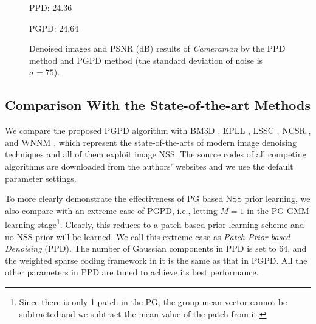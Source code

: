 \begin{figure}[ht!]
{\begin{minipage}[t]{0.24\textwidth}
{\footnotesize PPD: 24.36}
\end{minipage}
\begin{minipage}[t]{0.24\textwidth}
\centering
{}
{\footnotesize PGPD: 24.64}
\end{minipage}
}\vspace{-3mm}
    \caption{Denoised images and PSNR (dB) results of \textsl{Cameraman} by the PPD method and PGPD method (the standard deviation of noise is $\sigma=75$).}
    \label{fig2-9}
\end{figure}


\subsection{Comparison With the State-of-the-art Methods}
We compare the proposed PGPD algorithm with BM3D \cite{bm3d}, EPLL \cite{epll}, LSSC \cite{lssc}, NCSR \cite{ncsr}, and WNNM \cite{wnnm}, which represent the state-of-the-arts of modern image denoising techniques and all of them exploit image NSS. The source codes of all competing algorithms are downloaded from the authors' websites and we use the default parameter settings.  

To more clearly demonstrate the effectiveness of PG based NSS prior learning, we also compare with an extreme case of PGPD, i.e., letting $M=1$ in the PG-GMM learning stage\footnote{Since there is only 1 patch in the PG, the group mean vector cannot be subtracted and we subtract the mean value of the patch from it.}. Clearly, this reduces to a patch based prior learning scheme and no NSS prior will be learned. We call this extreme case as \textsl{Patch Prior based Denoising} (PPD).  The number of Gaussian components in PPD is set to 64, and the weighted sparse coding framework in it is the same as that in PGPD. All the other parameters in PPD are tuned to achieve its best performance.
